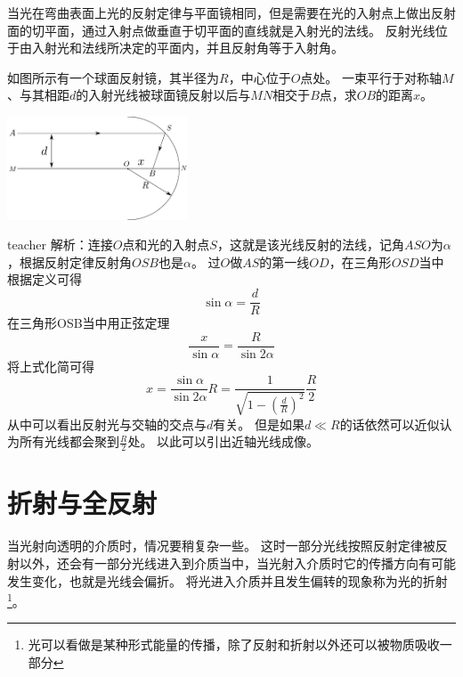 当光在弯曲表面上光的反射定律与平面镜相同，但是需要在光的入射点上做出反射面的切平面，通过入射点做垂直于切平面的直线就是入射光的法线。
反射光线位于由入射光和法线所决定的平面内，并且反射角等于入射角。





\begin{example}
如图所示有一个球面反射镜，其半径为$R$，中心位于$O$点处。
一束平行于对称轴$M$、与其相距$d$的入射光线被球面镜反射以后与$MN$相交于$B$点，求$OB$的距离$x$。
\begin{flushright}
\includegraphics[width=0.4\textwidth]{images/sphirical-mirrow-reflaction.pdf}
\end{flushright}
\begin{taggedblock}{teacher}
\noindent
解析：连接$O$点和光的入射点$S$，这就是该光线反射的法线，记角$ASO$为$\alpha$，根据反射定律反射角$OSB$也是$\alpha$。
过$O$做$AS$的第一线$OD$，在三角形$OSD$当中根据定义可得
\[
\sin\alpha=\frac{d}{R}
\]
在三角形OSB当中用正弦定理
\[
\frac{x}{\sin\alpha}=\frac{R}{\sin 2\alpha}
\]
将上式化简可得
\[
x=\frac{\sin\alpha}{\sin 2\alpha}R=\frac{1}{\sqrt{1-\left (\frac{d}{R}\right )^2}}\frac{R}{2}
\]
从中可以看出反射光与交轴的交点与$d$有关。
但是如果$d\ll R$的话依然可以近似认为所有光线都会聚到$\frac{R}{2}$处。
以此可以引出近轴光线成像。
\end{taggedblock}
\end{example}


\section{折射与全反射}
当光射向透明的介质时，情况要稍复杂一些。
这时一部分光线按照反射定律被反射以外，还会有一部分光线进入到介质当中，当光射入介质时它的传播方向有可能发生变化，也就是光线会偏折。
将光进入介质并且发生偏转的现象称为光的{\heiti 折射}\footnote{光可以看做是某种形式能量的传播，除了反射和折射以外还可以被物质吸收一部分}。
